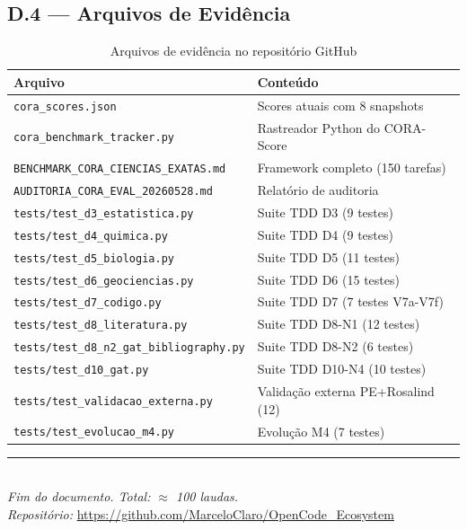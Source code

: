 \documentclass[12pt,a4paper,oneside]{article}
\begin{document}
\subsection{D.4 — Arquivos de Evidência}

\begin{table}[H]
\centering
\caption{Arquivos de evidência no repositório GitHub}
\label{tab:arquivos}
\begin{tabular}{p{}p{}}
\toprule
\textbf{Arquivo} & \textbf{Conteúdo} \\
\midrule
\texttt{cora\_scores.json} & Scores atuais com 8 snapshots \\
\texttt{cora\_benchmark\_tracker.py} & Rastreador Python do CORA-Score \\
\texttt{BENCHMARK\_CORA\_CIENCIAS\_EXATAS.md} & Framework completo (150 tarefas) \\
\texttt{AUDITORIA\_CORA\_EVAL\_20260528.md} & Relatório de auditoria \\
\texttt{tests/test\_d3\_estatistica.py} & Suite TDD D3 (9 testes) \\
\texttt{tests/test\_d4\_quimica.py} & Suite TDD D4 (9 testes) \\
\texttt{tests/test\_d5\_biologia.py} & Suite TDD D5 (11 testes) \\
\texttt{tests/test\_d6\_geociencias.py} & Suite TDD D6 (15 testes) \\
\texttt{tests/test\_d7\_codigo.py} & Suite TDD D7 (7 testes V7a-V7f) \\
\texttt{tests/test\_d8\_literatura.py} & Suite TDD D8-N1 (12 testes) \\
\texttt{tests/test\_d8\_n2\_gat\_bibliography.py} & Suite TDD D8-N2 (6 testes) \\
\texttt{tests/test\_d10\_gat.py} & Suite TDD D10-N4 (10 testes) \\
\texttt{tests/test\_validacao\_externa.py} & Validação externa PE+Rosalind (12) \\
\texttt{tests/test\_evolucao\_m4.py} & Evolução M4 (7 testes) \\
\bottomrule
\end{tabular}
\end{table}

\vspace{12pt}
\begin{center}
\rule{0.4\textwidth}{0.4pt}\\[6pt]
\textit{Fim do documento. Total: $\approx$ 100 laudas.}\\[6pt]
\textit{Repositório:} \url{https://github.com/MarceloClaro/OpenCode\_Ecosystem}
\end{center}
\end{document}
